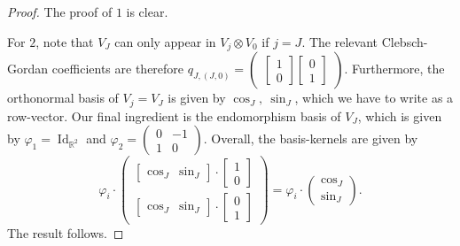 \documentclass[12pt, a4paper]{article}
\theoremstyle{plain}
\theoremstyle{definition}
\theoremstyle{remark}
\newcommand{\R}{\mathds{R}}
\DeclareMathOperator{\Id}{Id}
\begin{document}
\begin{proof}
The proof of $1$ is clear.

For $2$, note that $V_J$ can only appear in $V_j \otimes V_0$ if $j = J$. The relevant Clebsch-Gordan coefficients are therefore $q_{J,(J,0)} = \begin{pmatrix}\begin{bmatrix} 1 \\ 0\end{bmatrix} \begin{bmatrix} 0 \\ 1\end{bmatrix}\end{pmatrix}$. Furthermore, the orthonormal basis of $V_j = V_J$ is given by $\cos_J, \  \sin_J$, which we have to write as a row-vector. Our final ingredient is the endomorphism basis of $V_J$, which is given by $\varphi_1 = \Id_{\R^2}$ and $\varphi_2 = \begin{pmatrix} 0 & -1 \\ 1 & 0  \end{pmatrix}$. Overall, the basis-kernels are given by
\begin{equation*}
\varphi_i \cdot \begin{pmatrix} \begin{bmatrix} \cos_J & \sin_J\end{bmatrix} \cdot \begin{bmatrix} 1 \\ 0 \end{bmatrix} \\
\begin{bmatrix} \cos_J & \sin_J\end{bmatrix} \cdot \begin{bmatrix} 0 \\ 1 \end{bmatrix}
\end{pmatrix} = \varphi_i \cdot \begin{pmatrix} \cos_J \\ \sin_J \end{pmatrix}.
\end{equation*}
The result follows.


\end{proof}
\end{document}
